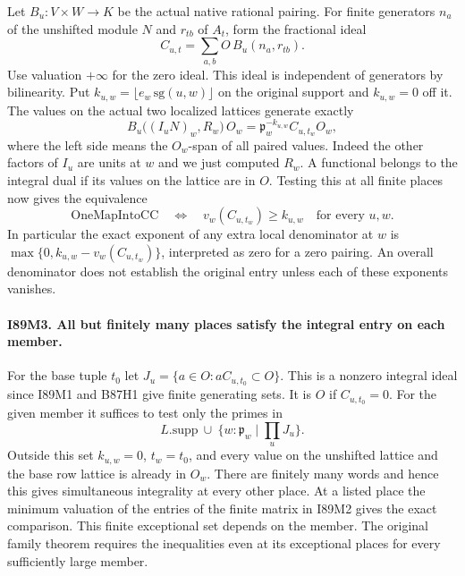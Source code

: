 Let $B_u:V\times W\to K$ be the actual native rational pairing.
For finite generators $n_a$ of the unshifted module $N$ and $r_{tb}$
of $A_t$, form the fractional ideal
\[
     C_{u,t}=\sum_{a,b} O\,B_u(n_a,r_{tb}).
\]
Use valuation $+\infty$ for the zero ideal. This ideal is
independent of generators by bilinearity. Put
$k_{u,w}=\lfloor e_w\,\mathrm{sg}(u,w)\rfloor$ on the original
support and $k_{u,w}=0$ off it. The values on the actual two localized
lattices generate exactly
\[
   B_u\big((I_uN)_w,R_w\big)\,O_w
        =\mathfrak p_w^{-k_{u,w}} C_{u,t_w}O_w ,
\]
where the left side means the $O_w$-span of all paired values.
Indeed the other factors of $I_u$ are units at $w$ and we just
computed $R_w$. A functional belongs to the integral dual if its
values on the lattice are in $O$. Testing this at all finite places
now gives the equivalence
\[
   \mathrm{OneMapIntoCC}\quad\Longleftrightarrow\quad
   v_w(C_{u,t_w})\ge k_{u,w}\quad\text{for every }u,w .
\]
In particular the exact exponent of any extra local denominator at
$w$ is $\max\{0,k_{u,w}-v_w(C_{u,t_w})\}$, interpreted as zero
for a zero pairing. An overall denominator does not establish the
original entry unless each of these exponents vanishes.

\paragraph{I89M3. All but finitely many places satisfy the integral entry on each member.}
For the base tuple $t_0$ let
$J_u=\{a\in O:aC_{u,t_0}\subset O\}$. This is a nonzero integral
ideal since I89M1 and B87H1 give finite generating sets. It is $O$ if
$C_{u,t_0}=0$. For the given member it suffices to test only the
primes in
\[
 L.\mathrm{supp}\ \cup\
 \{w:\mathfrak p_w\mid\prod_u J_u\}.
\]
Outside this set $k_{u,w}=0$, $t_w=t_0$, and every value on the
unshifted lattice and the base row lattice is already in $O_w$.
There are finitely many words and hence this gives simultaneous
integrality at every other place. At a listed place the minimum
valuation of the entries of the finite matrix in I89M2 gives
the exact comparison. This finite exceptional set depends on the
member. The original family theorem requires the inequalities
even at its exceptional places for every sufficiently large member.

